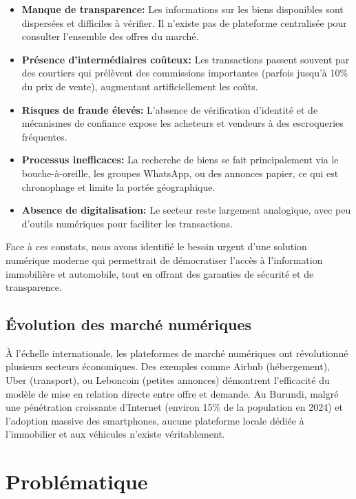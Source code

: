 \documentclass[12pt,a4paper]{report}
\begin{document}
\begin{itemize}
    \item \textbf{Manque de transparence:} Les informations sur les biens disponibles sont dispersées et difficiles à vérifier. Il n'existe pas de plateforme centralisée pour consulter l'ensemble des offres du marché.

    \item \textbf{Présence d'intermédiaires coûteux:} Les transactions passent souvent par des courtiers qui prélèvent des commissions importantes (parfois jusqu'à 10\% du prix de vente), augmentant artificiellement les coûts.

    \item \textbf{Risques de fraude élevés:} L'absence de vérification d'identité et de mécanismes de confiance expose les acheteurs et vendeurs à des escroqueries fréquentes.

    \item \textbf{Processus inefficaces:} La recherche de biens se fait principalement via le bouche-à-oreille, les groupes WhatsApp, ou des annonces papier, ce qui est chronophage et limite la portée géographique.

    \item \textbf{Absence de digitalisation:} Le secteur reste largement analogique, avec peu d'outils numériques pour faciliter les transactions.
\end{itemize}

Face à ces constats, nous avons identifié le besoin urgent d'une solution numérique moderne qui permettrait de démocratiser l'accès à l'information immobilière et automobile, tout en offrant des garanties de sécurité et de transparence.

\subsection{Évolution des marché numériques}

À l'échelle internationale, les plateformes de marché numériques ont révolutionné plusieurs secteurs économiques. Des exemples comme Airbnb (hébergement), Uber (transport), ou Leboncoin (petites annonces) démontrent l'efficacité du modèle de mise en relation directe entre offre et demande. Au Burundi, malgré une pénétration croissante d'Internet (environ 15\% de la population en 2024) et l'adoption massive des smartphones, aucune plateforme locale dédiée à l'immobilier et aux véhicules n'existe véritablement.

\section{Problématique}
\end{document}
